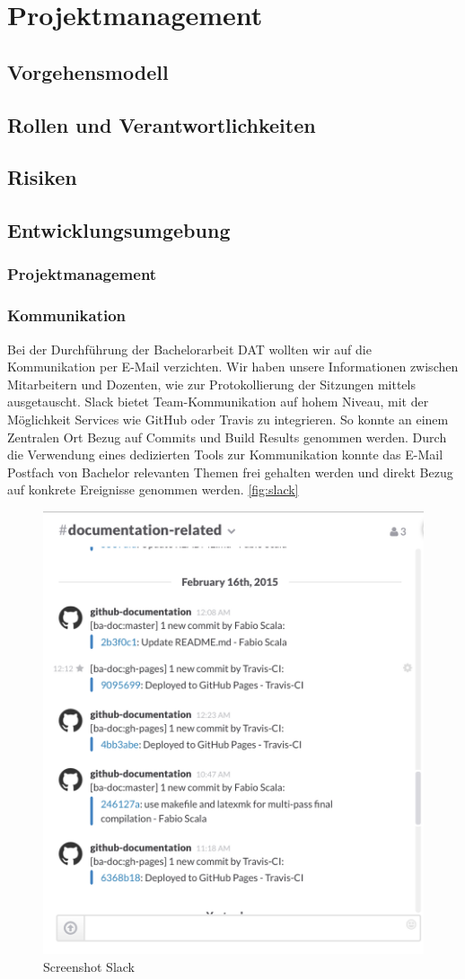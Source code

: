 \part{Projektmanagement}

\chapter{Vorgehensmodell}


\chapter{Rollen und Verantwortlichkeiten}


\chapter{Risiken}\label{sec:risiken}


\chapter{Entwicklungsumgebung}


\section{Projektmanagement}
\section{Kommunikation}
Bei der Durchführung der Bachelorarbeit DAT wollten wir auf die Kommunikation per E-Mail verzichten. Wir haben unsere Informationen zwischen Mitarbeitern und Dozenten, wie zur Protokollierung der Sitzungen mittels  ausgetauscht. Slack bietet Team-Kommunikation auf hohem Niveau, mit der Möglichkeit Services wie GitHub oder Travis zu integrieren. So konnte an einem Zentralen Ort Bezug auf Commits und Build Results genommen werden. Durch die Verwendung eines dedizierten Tools zur Kommunikation konnte das E-Mail Postfach von Bachelor relevanten Themen frei gehalten werden und direkt Bezug auf konkrete Ereignisse genommen werden. \vref{fig:slack} \\

\begin{figure}[H]
	\centering
	\includegraphics[width=0.5\linewidth]{fig/slack}
	\caption{Screenshot Slack}
	\label{fig:slack}
\end{figure}

